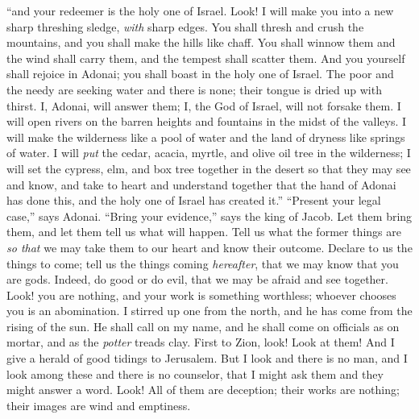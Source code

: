 \begin{biblechapter}
“and your redeemer is the holy one of Israel.
\verse Look! I will make you into a new sharp threshing sledge, 
\textit{with} sharp edges. 
You shall thresh and crush the mountains, 
and you shall make the hills like chaff.
\verse You shall winnow them and the wind shall carry them, 
and the tempest shall scatter them. 
And you yourself shall rejoice in Adonai; 
you shall boast in the holy one of Israel.
\verse The poor and the needy are seeking water and there is none; 
their tongue is dried up with thirst. 
I, Adonai, will answer them; 
I, the God of Israel, will not forsake them.
\verse I will open rivers on the barren heights 
and fountains in the midst of the valleys. 
I will make the wilderness like a pool of water 
and the land of dryness like springs of water.
\verse I will \textit{put} the cedar, acacia, myrtle, and olive oil tree in the wilderness; 
I will set the cypress, elm, and box tree together in the desert
\verse so that they may see and know, 
and take to heart and understand together 
that the hand of Adonai has done this, 
and the holy one of Israel has created it.”
\verse “Present your legal case,” says Adonai. 
“Bring your evidence,” says the king of Jacob.
\verse Let them bring them, 
and let them tell us what will happen. 
Tell us what the former things are 
\textit{so that} we may take them to our heart 
and know their outcome. 
Declare to us the things to come;
\verse tell us the things coming \textit{hereafter}, 
that we may know that you are gods. 
Indeed, do good or do evil, 
that we may be afraid and see together.
\verse Look! you are nothing, 
and your work is something worthless; 
whoever chooses you is an abomination.
\verse I stirred up one from the north, 
and he has come from the rising of the sun. He shall call on my name,
\verse and he shall come on officials as on mortar, 
and as the \textit{potter} treads clay.
\verse First to Zion, look! Look at them! And I give a herald of good tidings to Jerusalem.
\verse But I look and there is no man, 
and I look among these and there is no counselor, 
that I might ask them and they might answer a word.
\verse Look! All of them are deception; 
their works are nothing; 
their images are wind and emptiness.
\end{biblechapter}

